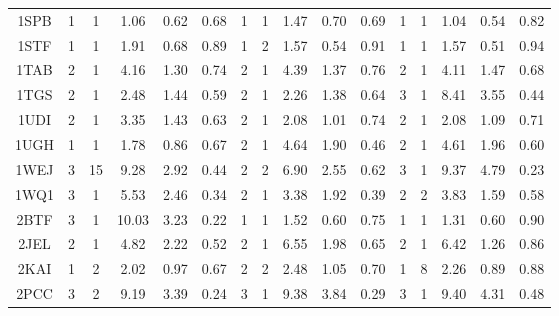 \begin{longtable}{c c c c c c|c c c c c|c c c c c}
 {\tiny 1SPB}&{\tiny 1}&{\tiny 1}&{\tiny 1.06}&{\tiny 0.62}&{\tiny 0.68}&{\tiny 1}&{\tiny 1}&{\tiny 1.47}&{\tiny 0.70}&{\tiny 0.69}&{\tiny 1}&{\tiny 1}&{\tiny 1.04}&{\tiny 0.54}&{\tiny 0.82}\\ 
 {\tiny 1STF}&{\tiny 1}&{\tiny 1}&{\tiny 1.91}&{\tiny 0.68}&{\tiny 0.89}&{\tiny 1}&{\tiny 2}&{\tiny 1.57}&{\tiny 0.54}&{\tiny 0.91}&{\tiny 1}&{\tiny 1}&{\tiny 1.57}&{\tiny 0.51}&{\tiny 0.94}\\ 
 {\tiny 1TAB}&{\tiny 2}&{\tiny 1}&{\tiny 4.16}&{\tiny 1.30}&{\tiny 0.74}&{\tiny 2}&{\tiny 1}&{\tiny 4.39}&{\tiny 1.37}&{\tiny 0.76}&{\tiny 2}&{\tiny 1}&{\tiny 4.11}&{\tiny 1.47}&{\tiny 0.68}\\ 
 {\tiny 1TGS}&{\tiny 2}&{\tiny 1}&{\tiny 2.48}&{\tiny 1.44}&{\tiny 0.59}&{\tiny 2}&{\tiny 1}&{\tiny 2.26}&{\tiny 1.38}&{\tiny 0.64}&{\tiny 3}&{\tiny 1}&{\tiny 8.41}&{\tiny 3.55}&{\tiny 0.44}\\ 
 {\tiny 1UDI}&{\tiny 2}&{\tiny 1}&{\tiny 3.35}&{\tiny 1.43}&{\tiny 0.63}&{\tiny 2}&{\tiny 1}&{\tiny 2.08}&{\tiny 1.01}&{\tiny 0.74}&{\tiny 2}&{\tiny 1}&{\tiny 2.08}&{\tiny 1.09}&{\tiny 0.71}\\ 
 {\tiny 1UGH}&{\tiny 1}&{\tiny 1}&{\tiny 1.78}&{\tiny 0.86}&{\tiny 0.67}&{\tiny 2}&{\tiny 1}&{\tiny 4.64}&{\tiny 1.90}&{\tiny 0.46}&{\tiny 2}&{\tiny 1}&{\tiny 4.61}&{\tiny 1.96}&{\tiny 0.60}\\ 
 {\tiny 1WEJ}&{\tiny 3}&{\tiny 15}&{\tiny 9.28}&{\tiny 2.92}&{\tiny 0.44}&{\tiny 2}&{\tiny 2}&{\tiny 6.90}&{\tiny 2.55}&{\tiny 0.62}&{\tiny 3}&{\tiny 1}&{\tiny 9.37}&{\tiny 4.79}&{\tiny 0.23}\\ 
 {\tiny 1WQ1}&{\tiny 3}&{\tiny 1}&{\tiny 5.53}&{\tiny 2.46}&{\tiny 0.34}&{\tiny 2}&{\tiny 1}&{\tiny 3.38}&{\tiny 1.92}&{\tiny 0.39}&{\tiny 2}&{\tiny 2}&{\tiny 3.83}&{\tiny 1.59}&{\tiny 0.58}\\ 
 {\tiny 2BTF}&{\tiny 3}&{\tiny 1}&{\tiny 10.03}&{\tiny 3.23}&{\tiny 0.22}&{\tiny 1}&{\tiny 1}&{\tiny 1.52}&{\tiny 0.60}&{\tiny 0.75}&{\tiny 1}&{\tiny 1}&{\tiny 1.31}&{\tiny 0.60}&{\tiny 0.90}\\ 
 {\tiny 2JEL}&{\tiny 2}&{\tiny 1}&{\tiny 4.82}&{\tiny 2.22}&{\tiny 0.52}&{\tiny 2}&{\tiny 1}&{\tiny 6.55}&{\tiny 1.98}&{\tiny 0.65}&{\tiny 2}&{\tiny 1}&{\tiny 6.42}&{\tiny 1.26}&{\tiny 0.86}\\ 
 {\tiny 2KAI}&{\tiny 1}&{\tiny 2}&{\tiny 2.02}&{\tiny 0.97}&{\tiny 0.67}&{\tiny 2}&{\tiny 2}&{\tiny 2.48}&{\tiny 1.05}&{\tiny 0.70}&{\tiny 1}&{\tiny 8}&{\tiny 2.26}&{\tiny 0.89}&{\tiny 0.88}\\ 
 {\tiny 2PCC}&{\tiny 3}&{\tiny 2}&{\tiny 9.19}&{\tiny 3.39}&{\tiny 0.24}&{\tiny 3}&{\tiny 1}&{\tiny 9.38}&{\tiny 3.84}&{\tiny 0.29}&{\tiny 3}&{\tiny 1}&{\tiny 9.40}&{\tiny 4.31}&{\tiny 0.48}\\ 

\end{longtable}
